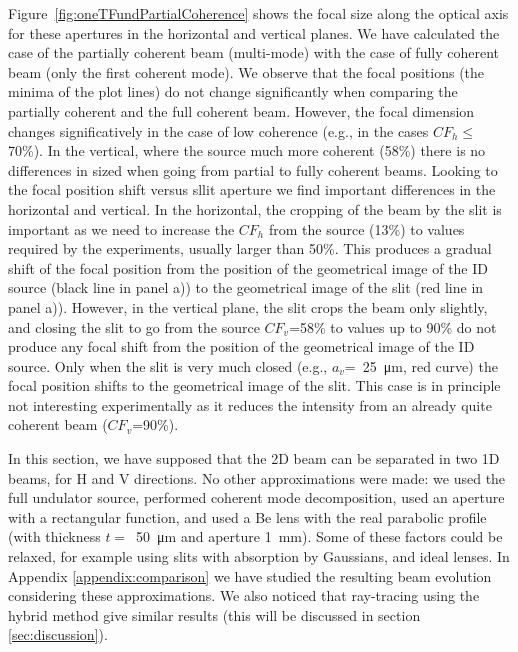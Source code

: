 \documentclass{iucr}              %
\begin{document}
Figure~\ref{fig:oneTFundPartialCoherence} shows the focal size along the optical axis for these apertures in the horizontal and vertical planes. We have calculated the case of the partially coherent beam (multi-mode) with the case of fully coherent beam (only the first coherent mode). We observe that the focal positions (the minima of the plot lines) do not change significantly when comparing the partially coherent and the full coherent beam. However, the focal dimension changes significatively in the case of low coherence (e.g., in the cases $CF_h\le$70\%). In the vertical, where the source much more coherent (58\%) there is no differences in sized when going from partial to fully coherent beams. Looking to the focal position shift versus sllit aperture we find important differences in the horizontal and vertical. In the horizontal, the cropping of the beam by the slit is important as we need to increase the $CF_h$ from the source (13\%) to values required by the experiments, usually larger than 50\%. This produces a gradual shift of the focal position from the position of the geometrical image of the ID source (black line in panel a)) to the geometrical image of the slit (red line in panel a)). However, in the vertical plane, the slit crops the beam only slightly, and closing the slit to go from the source $CF_v$=58\% to values up to 90\% do not produce any focal shift from the  position of the geometrical image of the ID source. Only when the slit is very much closed (e.g., $a_v$=~\SI{25}{\micro\meter}, red curve) the focal position shifts to the geometrical image of the slit. This case is in principle not interesting experimentally as it reduces the intensity from an already quite coherent beam ($CF_v$=90\%). 

In this section, we have supposed that the 2D beam can be separated in two 1D beams, for H and V directions. No other approximations were made: we used the full undulator source, performed coherent mode decomposition, used an aperture with a rectangular function, and used a Be lens with the real parabolic profile (with thickness $t=$~\SI{50}{\micro\meter} and aperture \SI{1}{\milli\meter}). Some of these factors could be relaxed, for example using slits with absorption by Gaussians, and ideal lenses. In Appendix \ref{appendix:comparison} we have studied the resulting beam evolution considering these approximations. We also noticed that ray-tracing using the hybrid method \cite{codeHYBRID} give similar results (this will be discussed in section \ref{sec:discussion}). 
\end{document}
